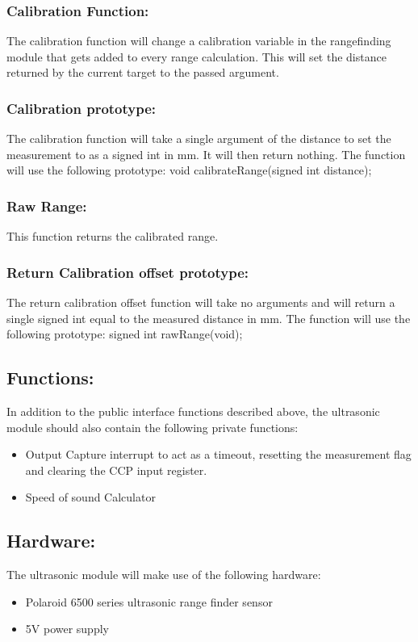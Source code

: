 \documentclass[]{article}
\begin{document}
\subsubsection{Calibration Function:}
The calibration function will change a calibration variable in the rangefinding module that gets added to every range calculation. This will set the distance returned by the current target to the passed argument.

\subsubsection{Calibration prototype:}
The calibration function will take a single argument of the distance to set the measurement to as a signed int in mm. It will then return nothing. The function will use the following prototype: \newline \newline 
void calibrateRange(signed int distance);

\subsubsection{Raw Range:}
This function returns the calibrated range.

\subsubsection{Return Calibration offset prototype:}
The return calibration offset function will take no arguments and will return a single signed int equal to the measured distance in mm. The function will use the following prototype: \newline \newline
signed int rawRange(void);

\subsection{Functions:}
In addition to the public interface functions described above, the ultrasonic module should also contain the following private functions:
\begin{itemize}
	\item Output Capture interrupt to act as a timeout, resetting the measurement flag and clearing the CCP input register.
	\item Speed of sound Calculator
\end{itemize}

\subsection{Hardware:}
The ultrasonic module will make use of the following hardware: 
\begin{itemize}
	\item Polaroid 6500 series ultrasonic range finder sensor
	\item 5V power supply
\end{itemize}
\end{document}
